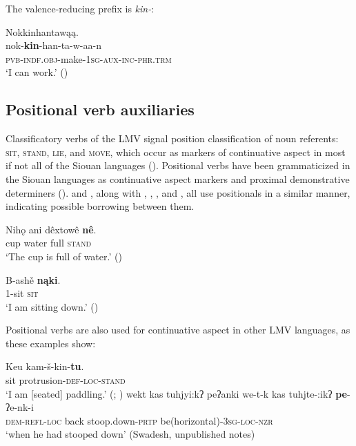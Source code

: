 \documentclass[output=paper]{LSP/langsci}
\begin{document}
	The  valence-reducing prefix is \emph{kin-}:
	
\ea	Nokkinhantawąą.\\
\gll		nok-\textbf{kin}-han-ta-w-aa-n\\
		\textsc{pvb-indf.obj}-make-\textsc{1sg-aux-inc-phr.trm}\\
\glt	`I can work.' (\citealt[405]{Kimball2005})
\z

\subsection{Positional verb auxiliaries}

Classificatory verbs of the LMV signal position classification of noun referents: \textsc{sit}, \textsc{stand}, \textsc{lie}, and \textsc{move}, which occur as markers of continuative aspect in most if not all of the Siouan languages (\citealt[203]{Rankin2004positionals}). Positional verbs have been grammaticized in the Siouan languages as continuative aspect markers and proximal demonstrative determiners (\citealt[116]{Mithun1999}).  and , along with , , , and , all use positionals in a similar manner, indicating possible borrowing between them. 

\ea
\settowidth{}
\gll	Nihǫ 	ani 	dêxtowê \textbf{nê}.\\
		cup water full  \textsc{stand}\\ 
\glt	`The cup is full of water.' (\citealt[166]{DorseySwanton1912})
\z
		
\ea
\settowidth{}
\gll	B-ashě \textbf{nąki}.\\
		1-sit \textsc{sit}\\ 
\glt	`I am sitting down.' (\citealt[20]{Rankin2002})
\z

Positional verbs are also used for continuative aspect in other LMV languages, as these examples show:

\ea
\settowidth{}
\gll	Keu kam-š-kin-\textbf{tu}.\\
		sit protrusion-\textsc{def-loc-stand}\\ 
\glt `I am [seated] paddling.' (\citealt[61]{GatschetSwanton1932}; \citealt[27]{Watkins1976})\footnotemark
\z
{}
\ea	
\settowidth{}
wekt kas tuhjyi:kʔ peʔanki 
\gll		we-t-k 	 kas 	 tuhjte-:ikʔ 	 \textbf{pe}-ʔe-nk-i\\
		\textsc{dem-refl-loc} back	  stoop.down-\textsc{prtp} be(horizontal)-\textsc{3sg-loc-nzr}\\
\glt	`when he had stooped down' (Swadesh, unpublished notes)
\z
\end{document}
